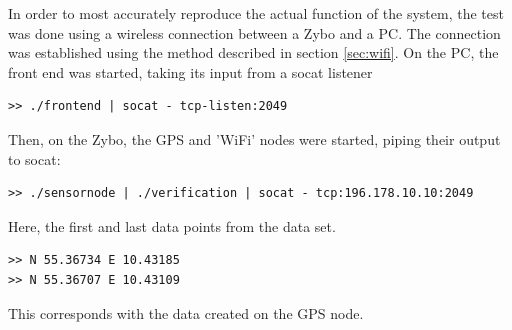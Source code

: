 In order to most accurately reproduce the actual function of the system, the test was done using a wireless connection between a Zybo and a PC.
The connection was established using the method described in section \ref{sec:wifi}.
On the PC, the front end was started, taking its input from a socat listener
\begin{lstlisting}
>> ./frontend | socat - tcp-listen:2049
\end{lstlisting}
Then, on the Zybo, the GPS and 'WiFi' nodes were started, piping their output to socat:
\begin{lstlisting}
>> ./sensornode | ./verification | socat - tcp:196.178.10.10:2049
\end{lstlisting}
Here, the first and last data points from the data set.
\begin{lstlisting}
>> N 55.36734 E 10.43185
>> N 55.36707 E 10.43109
\end{lstlisting}
This corresponds with the data created on the GPS node.
